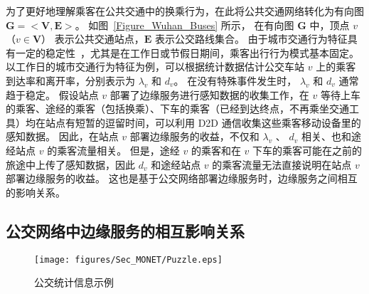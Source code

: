 为了更好地理解乘客在公共交通中的换乘行为，在此将公共交通网络转化为有向图 $\boldsymbol{G}=<\boldsymbol{V}, \boldsymbol{E}>$。
如图~\ref{Figure_Wuhan_Buses} 所示，
在有向图 $\boldsymbol{G}$ 中，顶点 $v$（$v \in \boldsymbol{V}$） 表示公共交通站点，$\boldsymbol{E}$ 表示公交路线集合。
由于城市交通行为特征具有一定的稳定性~\cite{TAO201490}，尤其是在工作日或节假日期间，乘客出行行为模式基本固定。
以工作日的城市交通行为特征为例，可以根据统计数据估计公交车站 $v$ 上的乘客到达率和离开率，分别表示为 $\lambda_v$ 和 $d_v$。
在没有特殊事件发生时， $\lambda_v$ 和 $d_v$ 通常趋于稳定。
假设站点 $v$ 部署了边缘服务进行感知数据的收集工作，在 $v$ 等待上车的乘客、途经的乘客（包括换乘）、下车的乘客（已经到达终点，不再乘坐交通工具）均在站点有短暂的逗留时间，可以利用 D2D 通信收集这些乘客移动设备里的感知数据。
因此，在站点 $v$ 部署边缘服务的收益，不仅和 $\lambda_v$ 、 $d_v$ 相关、也和途经站点 $v$ 的乘客流量相关。
但是，途经 $v$ 的乘客和在 $v$ 下车的乘客可能在之前的旅途中上传了感知数据，因此 $d_v$ 和途经站点 $v$ 的乘客流量无法直接说明在站点 $v$ 部署边缘服务的收益。
这也是基于公交网络部署边缘服务时，边缘服务之间相互的影响关系。




\subsection{公交网络中边缘服务的相互影响关系}

\begin{figure}[!b]
  \centering
  \texttt{[image: figures/Sec\_MONET/Puzzle.eps]}
  \caption{公交统计信息示例}
  \label{Figure_puzzle}
\end{figure}

